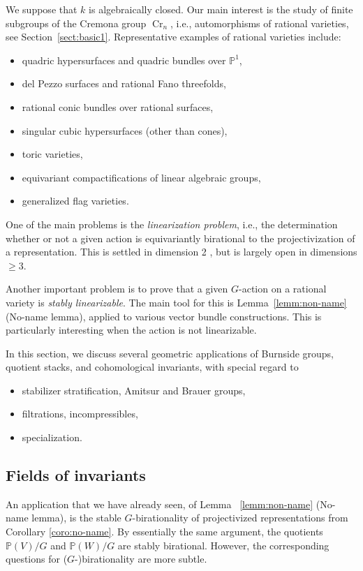 \documentclass[12pt,reqno]{amsart}
\theoremstyle{plain}
\theoremstyle{remark}
\theoremstyle{definition}
\numberwithin{equation}{section}
\newcommand{\bP}{{\mathbb P}}
\newcommand{\fS}{{\mathfrak S}}
\DeclareMathOperator{\Cr}{Cr}
\begin{document}
We suppose that $k$ is algebraically closed. 
Our main interest is the study of finite subgroups of the Cremona group $\Cr_n$, i.e., automorphisms of rational varieties, see Section~\ref{sect:basic1}.
Representative examples of rational varieties include:
\begin{itemize}
\item quadric hypersurfaces and quadric bundles over $\bP^1$, 
\item del Pezzo surfaces and rational Fano threefolds,  
\item rational conic bundles over rational surfaces, 
\item singular cubic hypersurfaces (other than cones),
\item toric varieties,
\item equivariant compactifications of linear algebraic groups, 
\item generalized flag varieties. 
\end{itemize}
One of the main problems is the {\em linearization problem}, i.e., the determination whether or not a given action is equivariantly birational to the projectivization of a representation. This is settled in dimension 2 \cite{pinardin}, but is largely open in dimensions $\ge 3$. 

Another important problem is to prove that 
a given $G$-action on a rational variety is 
{\em stably linearizable}. The main tool for this is Lemma~\ref{lemm:non-name} (No-name lemma), applied to various vector bundle constructions. This is particularly interesting when the action is not linearizable. 



In this section, we discuss several geometric applications 
of Burnside groups, quotient stacks, and cohomological invariants, with special regard to
\begin{itemize}
\item stabilizer stratification, Amitsur and Brauer groups,
\item filtrations, incompressibles,
\item specialization.
\end{itemize}




\subsection*{Fields of invariants}
An application that we have already seen, of Lemma ~\ref{lemm:non-name} (No-name lemma), is the stable $G$-birationality of projectivized representations from Corollary \ref{coro:no-name}.
By essentially the same argument, the quotients $\bP(V)/G$ and $\bP(W)/G$ are stably birational.
However, the corresponding questions for ($G$-)birationality are more subtle.
\end{document}
